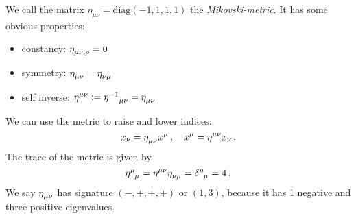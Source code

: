 We call the matrix $\eta_{\mu\nu}=\mathrm{diag}(-1,1,1,1)$ the
\emph{Mikovski-metric}. It has some obvious properties:
\begin{itemize}
  \item constancy: $\tensor{\eta}{_\mu_\nu_,_\rho}=0$
  \item symmetry: $\tensor{\eta}{_\mu_\nu}=\tensor{\eta}{_\nu_\mu}$
  \item self inverse:
  $\tensor{\eta}{^\mu^\nu}:=\tensor{{\eta^{-1}}}{_\mu_\nu}=\tensor{\eta}{_\mu_\nu}$
\end{itemize}
We can use the metric to raise and lower indices:
\begin{equation}
x_\nu=\tensor{\eta}{_\mu_\nu}x^\mu\, ,\quad x^\mu=\tensor{\eta}{^\mu^\nu}x_\nu\,
.
\end{equation}
The trace of the metric is given by
\begin{equation}
\tensor{\eta}{^\mu_\mu}=\tensor{\eta}{^\mu^\nu}\tensor{\eta}{_\nu_\mu}
=\tensor{\delta}{^\mu_\mu}=4\, .
\end{equation}
We say $\tensor{\eta}{_\mu_\nu}$ has signature $(-,+,+,+)$ or $(1,3)$, because
it has 1 negative and three positive eigenvalues.
